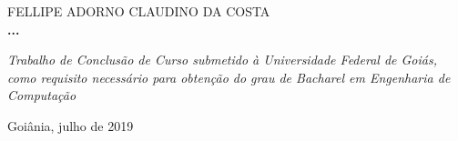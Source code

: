 
\begin{center}

    {\large FELLIPE ADORNO CLAUDINO DA COSTA\\}
    \vspace{8cm}
    {\Large \textsc\textbf{{...} }\\}
    \vspace{1cm}
    \hspace{.45\linewidth}
    \begin{minipage}{.50\linewidth}

            \textit{Trabalho de Conclusão de Curso submetido à Universidade Federal de Goiás,  como requisito 
            necessário para obtenção do grau de Bacharel em Engenharia de Computação }

           
    
    \end{minipage}

    \vspace{2cm}
    \vfill
    {\large Goiânia, julho de 2019}
\end{center}

